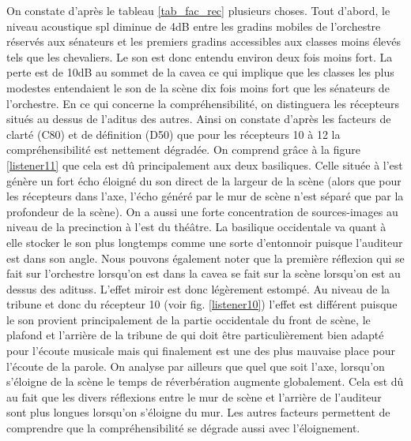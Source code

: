  
On constate d'après le tableau \ref{tab_fac_rec} plusieurs choses. Tout d'abord, le niveau acoustique \gls{spl} diminue de 4dB entre les gradins mobiles de l'orchestre réservés aux sénateurs et les premiers gradins accessibles aux classes moins élevés tels que les chevaliers. Le son est donc entendu environ deux fois moins fort. La perte est de 10dB au sommet de la \gls{cavea} ce qui implique que les classes les plus modestes entendaient le son de la scène dix fois moins fort que les sénateurs de l'orchestre. En ce qui concerne la compréhensibilité, on distinguera les récepteurs situés au dessus de l'\gls{aditus} des autres. Ainsi on constate d'après les facteurs de clarté (\gls{C80}) et de définition (\gls{D50}) que pour les récepteurs 10 à 12 la compréhensibilité est nettement dégradée. On comprend grâce à la figure \ref{listener11} que cela est dû principalement aux deux \glspl{basilique}. Celle située à l'est génère un fort écho éloigné du son direct de la largeur de la scène (alors que pour les récepteurs dans l'axe, l'écho généré par le mur de scène n'est séparé que par la profondeur de la scène). On a aussi une forte concentration de sources-images au niveau de la \gls{precinction} à l'est du théâtre. La basilique occidentale va quant à elle stocker le son plus longtemps comme une sorte d'entonnoir puisque l'auditeur est dans son angle. Nous pouvons également noter que la première réflexion qui se fait sur l'orchestre lorsqu'on est dans la \gls{cavea} se fait sur la scène lorsqu'on est au dessus des \glspl{aditus}. L'effet miroir est donc légèrement estompé. Au niveau de la tribune et donc du récepteur 10 (voir fig. \ref{listener10}) l'effet est différent puisque le son provient principalement de la partie occidentale du front de scène, le plafond et l'arrière de la tribune de qui doit être particulièrement bien adapté pour l'écoute musicale mais qui finalement est une des plus mauvaise place pour l'écoute de la parole.
On analyse par ailleurs que quel que soit l'axe, lorsqu'on s'éloigne de la scène le temps de réverbération augmente globalement. Cela est dû au fait que les divers réflexions entre le mur de scène et l'arrière de l'auditeur sont plus longues lorsqu'on s'éloigne du mur. Les autres facteurs permettent de comprendre que la compréhensibilité se dégrade aussi avec l'éloignement. %
